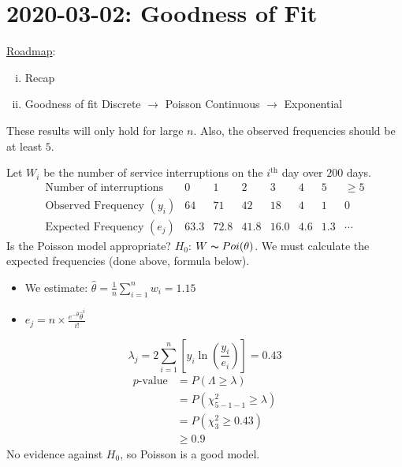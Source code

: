 \section{2020-03-02: Goodness of Fit}
\underline{Roadmap}:
\begin{enumerate}[(i)]
    \item Recap
    \item Goodness of fit
          \subitem Discrete $ \rightarrow $ Poisson
          \subitem Continuous $ \rightarrow $ Exponential
\end{enumerate}
These results will only hold for large $ n $. Also,
the observed frequencies should be at least $ 5 $.

\begin{exbox}
    \begin{example}[Poisson]
        Let $ W_i $ be the number of service interruptions on the $ i^{\text{th}} $ day
        over $ 200 $ days.
        \[
            \begin{array}{cccccccc}
                \text{Number of interruptions}   & 0    & 1    & 2    & 3    & 4   & 5   & \geqslant 5 \\
                \text{Observed Frequency } (y_i) & 64   & 71   & 42   & 18   & 4   & 1   & 0           \\
                \text{Expected Frequency } (e_j) & 63.3 & 72.8 & 41.8 & 16.0 & 4.6 & 1.3 & \cdots
            \end{array}
        \]
        Is the Poisson model appropriate? $ H_0 $: $ W \thicksim Poi(\theta) $.
        We must calculate the expected frequencies (done above, formula below).
        \begin{itemize}
            \item We estimate: $ \hat{\theta}=\frac{1}{n} \sum\limits_{i=1}^{n} w_i=1.15 $
            \item $ e_j=n\times \frac{e^{-\hat{\theta}}\hat{\theta}^i}{i!} $
        \end{itemize}
        \[ \lambda_j=2 \sum\limits_{i=1}^{n} \left[ y_i \ln\left( \frac{y_i}{e_i} \right) \right]=0.43 \]
        \begin{align*}
            p\text{-value}
             & =P(\Lambda\geqslant \lambda)        \\
             & =P(\chi^2_{5-1-1}\geqslant \lambda) \\
             & =P(\chi^2_3\geqslant 0.43)          \\
             & \geqslant 0.9
        \end{align*}
        No evidence against $ H_0 $, so Poisson is a good model.
    \end{example}
\end{exbox}
